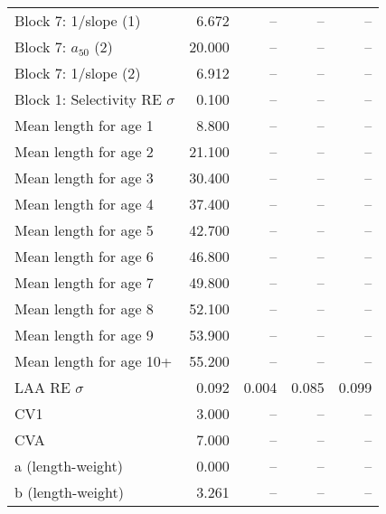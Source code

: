 \documentclass[
]{article}
\begin{document}
\begin{landscape}
\begin{longtable}[t]{lrrrr}
Block 7: 1/slope (1) & 6.672 & -- & -- & --\\
Block 7: $a_{50}$ (2) & 20.000 & -- & -- & --\\
Block 7: 1/slope (2) & 6.912 & -- & -- & --\\
\addlinespace
Block 1: Selectivity RE $\sigma$ & 0.100 & -- & -- & --\\
Mean length for age 1 & 8.800 & -- & -- & --\\
Mean length for age 2 & 21.100 & -- & -- & --\\
Mean length for age 3 & 30.400 & -- & -- & --\\
Mean length for age 4 & 37.400 & -- & -- & --\\
\addlinespace
Mean length for age 5 & 42.700 & -- & -- & --\\
Mean length for age 6 & 46.800 & -- & -- & --\\
Mean length for age 7 & 49.800 & -- & -- & --\\
Mean length for age 8 & 52.100 & -- & -- & --\\
Mean length for age 9 & 53.900 & -- & -- & --\\
\addlinespace
Mean length for age 10+ & 55.200 & -- & -- & --\\
LAA RE $\sigma$ & 0.092 & 0.004 & 0.085 & 0.099\\
CV1 & 3.000 & -- & -- & --\\
CVA & 7.000 & -- & -- & --\\
a (length-weight) & 0.000 & -- & -- & --\\
\addlinespace
b (length-weight) & 3.261 & -- & -- & --\\*
\end{longtable}
\end{landscape}
\end{document}
